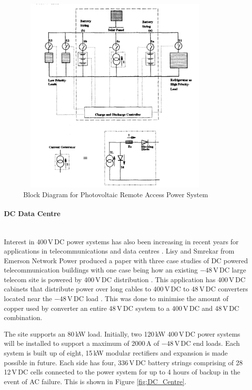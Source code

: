 \begin{figure}[H]
\hfill\includegraphics[width = 100mm, height = 100mm]{images/RAPS_Block}\hspace*{\fill}
\caption{Block Diagram for Photovoltaic Remote Access Power System \cite{Zahedi}}
\label{fig:RAPS_Block}
\end{figure}        


\paragraph{DC Data Centre}
~\\
Interest in 400\,V\,DC power systems has also been increasing in recent years for applications in telecommunications and data centres \cite{Lisy2015}. Lisy and Smrekar from Emerson Network Power produced a paper with three case studies of DC powered telecommunication buildings with one case being how an existing $\num{-48}$\,V\,DC large telecom site is powered by 400\,V\,DC distribution \cite{Lisy2015}. This application has 400\,V\,DC cabinets that distribute power over long cables to 400\,V\,DC to 48\,V\,DC converters located near the $\num{-48}$\,V\,DC load \cite{Lisy2015}. This was done to minimise the amount of copper used by converter an entire 48\,V\,DC system to a 400\,V\,DC and 48\,V\,DC combination.
\newline

The site supports an 80\,kW load. Initially, two 120\,kW 400\,V\,DC power systems will be installed to support a maximum of 2000\,A of $\num{-48}$\,V\,DC end loads. Each system is built up of eight, 15\,kW modular rectifiers and expansion is made possible in future. Each side has four, 336\,V\,DC battery strings comprising of 28 12\,V\,DC cells connected to the power system for up to 4 hours of backup in the event of AC failure. This is shown in Figure \ref{fig:DC_Centre}. 

